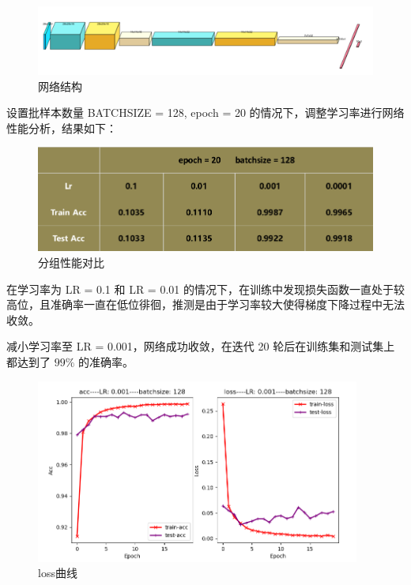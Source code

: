 \documentclass[12pt]{article}
\begin{document}
	\begin{figure}[H]
		\centering
		\includegraphics[width=6in]{./images/mnist_network.png}
		\centering
		\caption{网络结构}
	\end{figure}
	
	设置批样本数量 BATCHSIZE = 128, epoch = 20 的情况下，调整学习率进行网络性能分析，结果如下：
	
	\begin{figure}[H]
		\centering
		\includegraphics[width=4.5in]{./images/mnist_train.png}
		\centering
		\caption{分组性能对比}
	\end{figure}
	
	在学习率为 LR = 0.1 和 LR = 0.01 的情况下，在训练中发现损失函数一直处于较高位，且准确率一直在低位徘徊，推测是由于学习率较大使得梯度下降过程中无法收敛。
	

	减小学习率至 LR = 0.001，网络成功收敛，在迭代 20 轮后在训练集和测试集上都达到了 $99\%$ 的准确率。
	
	
	\begin{figure}[H]
		\centering
		\includegraphics[width=4.2in]{./images/mnist_loss.png}
		\centering
		\caption{loss曲线}
	\end{figure}
	
\end{document}
